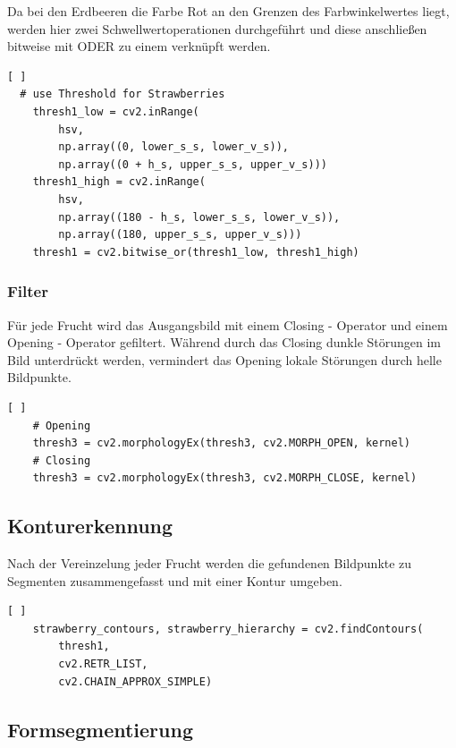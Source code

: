 Da bei den Erdbeeren die Farbe Rot an den Grenzen des Farbwinkelwertes liegt, werden hier zwei Schwellwertoperationen durchgeführt und diese anschließen bitweise mit ODER zu einem verknüpft werden.
\lstset{language=Python}
\begin{lstlisting}[ ]
  # use Threshold for Strawberries
    thresh1_low = cv2.inRange(
        hsv,
        np.array((0, lower_s_s, lower_v_s)),
        np.array((0 + h_s, upper_s_s, upper_v_s)))
    thresh1_high = cv2.inRange(
        hsv,
        np.array((180 - h_s, lower_s_s, lower_v_s)),
        np.array((180, upper_s_s, upper_v_s)))
    thresh1 = cv2.bitwise_or(thresh1_low, thresh1_high)
\end{lstlisting}

\subsubsection{Filter}

Für jede Frucht wird das Ausgangsbild mit einem Closing - Operator und einem Opening - Operator gefiltert. Während durch das Closing dunkle Störungen im Bild unterdrückt werden, vermindert das Opening lokale Störungen durch helle Bildpunkte.  \\
\lstset{language=Python}
\begin{lstlisting}[ ]
    # Opening
    thresh3 = cv2.morphologyEx(thresh3, cv2.MORPH_OPEN, kernel)
    # Closing
    thresh3 = cv2.morphologyEx(thresh3, cv2.MORPH_CLOSE, kernel)
\end{lstlisting}

\subsection{Konturerkennung}
Nach der Vereinzelung jeder Frucht werden die gefundenen Bildpunkte zu Segmenten zusammengefasst und mit einer Kontur umgeben. 

\lstset{language=Python}
\begin{lstlisting}[ ]
    strawberry_contours, strawberry_hierarchy = cv2.findContours(
        thresh1,
        cv2.RETR_LIST,
        cv2.CHAIN_APPROX_SIMPLE)
\end{lstlisting}

\subsection{Formsegmentierung}

